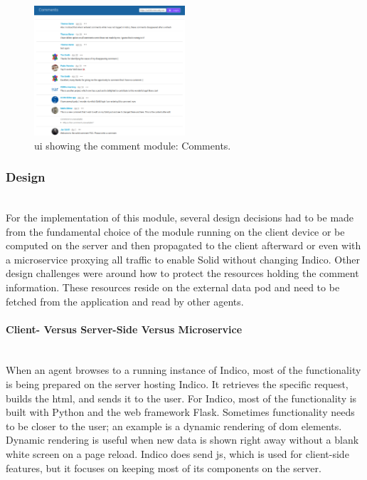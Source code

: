 \begin{figure}[ht!]
    \centering
    \includegraphics[width=0.5\textwidth]{prototype/poc-solid-comment-comments.png}
    \caption{\gls{ui} showing the comment module: Comments.}
    \label{fig:poc-solid-comment-comments}
\end{figure}

\subsubsection{Design}\label{subsubsection:design}\mbox{}\\

For the implementation of this module, several design decisions had to be made from the fundamental choice of the module running on the client device or be computed on the server and then propagated to the client afterward or even with a microservice proxying all traffic to enable Solid without changing Indico.
Other design challenges were around how to protect the resources holding the comment information. These resources reside on the external data pod and need to be fetched from the application and read by other agents.
\vspace{0.5cm}
\paragraph{Client- Versus Server-Side Versus Microservice}\mbox{}\\

When an agent browses to a running instance of Indico, most of the functionality is being prepared on the server hosting Indico. It retrieves the specific request, builds the \gls{html}, and sends it to the user. For Indico, most of the functionality is built with Python and the web framework Flask. Sometimes functionality needs to be closer to the user; an example is a dynamic rendering of \gls{dom} elements. Dynamic rendering is useful when new data is shown right away without a blank white screen on a page reload. Indico does send \gls{js}, which is used for client-side features, but it focuses on keeping most of its components on the server.

